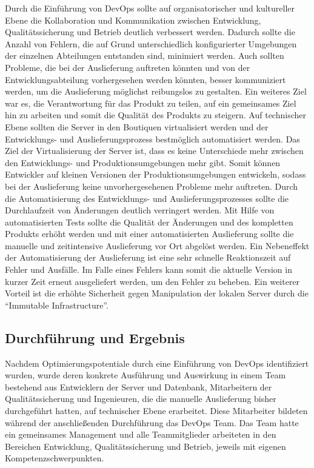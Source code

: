Durch die Einführung von DevOps sollte auf organisatorischer und kultureller Ebene die Kollaboration und Kommunikation zwischen Entwicklung, Qualitätssicherung und Betrieb deutlich verbessert werden. 
Dadurch sollte die Anzahl von Fehlern, die auf Grund unterschiedlich konfigurierter Umgebungen der einzelnen Abteilungen entstanden sind, minimiert werden. 
Auch sollten Probleme, die bei der Auslieferung auftreten könnten und von der Entwicklungsabteilung vorhergesehen werden könnten, besser kommuniziert werden, um die Auslieferung möglichst reibungslos zu gestalten. 
Ein weiteres Ziel war es, die Verantwortung für das Produkt zu teilen, auf ein gemeinsames Ziel hin zu arbeiten und somit die Qualität des Produkts zu steigern. 
Auf technischer Ebene sollten die Server in den Boutiquen virtualisiert werden und der Entwicklungs- und Auslieferungsprozess bestmöglich automatisiert werden. 
Das Ziel der Virtualisierung der Server ist, dass es keine Unterschiede mehr zwischen den Entwicklungs- und Produktionsumgebungen mehr gibt. 
Somit können Entwickler auf kleinen Versionen der Produktionsumgebungen entwickeln, sodass bei der Auslieferung keine unvorhergesehenen Probleme mehr auftreten. 
Durch die Automatisierung des Entwicklungs- und Auslieferungsprozesses sollte die Durchlaufzeit von Änderungen deutlich verringert werden. 
Mit Hilfe von automatisierten Tests sollte die Qualität der Änderungen und des kompletten Produkts erhöht werden und mit einer automatisierten Auslieferung sollte die manuelle und zeitintensive Auslieferung vor Ort abgelöst werden. 
Ein Nebeneffekt der Automatisierung der Auslieferung ist eine sehr schnelle Reaktionszeit auf Fehler und Ausfälle. 
Im Falle eines Fehlers kann somit die aktuelle Version in kurzer Zeit erneut ausgeliefert werden, um den Fehler zu beheben. 
Ein weiterer Vorteil ist die erhöhte Sicherheit gegen Manipulation der lokalen Server durch die \enquote{Immutable Infrastructure}. 
\parencite[Vgl.][S. 5]{Reed:2014}

\subsection{Durchführung und Ergebnis}
Nachdem Optimierungspotentiale durch eine Einführung von DevOps identifiziert wurden, wurde deren konkrete Ausführung und Auswirkung in einem Team bestehend aus Entwicklern der Server und Datenbank, Mitarbeitern der Qualitätssicherung und Ingenieuren, die die manuelle Auslieferung bisher durchgeführt hatten, auf technischer Ebene erarbeitet.
Diese Mitarbeiter bildeten während der anschließenden Durchführung das DevOps Team. 
Das Team hatte ein gemeinsames Management und alle Teammitglieder arbeiteten in den Bereichen Entwicklung, Qualitätssicherung und Betrieb, jeweils mit eigenen Kompetenzschwerpunkten. 
\parencite[Vgl.][S. 4]{Reed:2014}

